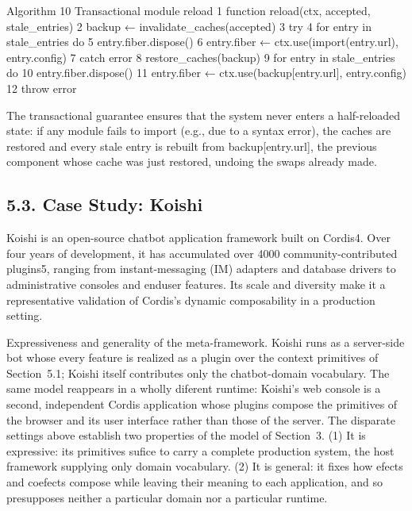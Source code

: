 \documentclass[
  10
]{article}
\begin{document}
Algorithm 10 Transactional module reload 1 function reload(ctx,
accepted, stale\_entries) 2 backup ← invalidate\_caches(accepted) 3 try
4 for entry in stale\_entries do 5 entry.fiber.dispose() 6 entry.fiber ←
ctx.use(import(entry.url), entry.config) 7 catch error 8
restore\_caches(backup) 9 for entry in stale\_entries do 10
entry.fiber.dispose() 11 entry.fiber ← ctx.use(backup{[}entry.url{]},
entry.config) 12 throw error

The transactional guarantee ensures that the system never enters a
half-reloaded state: if any module fails to import (e.g., due to a
syntax error), the caches are restored and every stale entry is rebuilt
from backup{[}entry.url{]}, the previous component whose cache was just
restored, undoing the swaps already made.

\subsection{5.3. Case Study: Koishi}\label{case-study-koishi}

Koishi is an open-source chatbot application framework built on Cordis4.
Over four years of development, it has accumulated over 4000
community-contributed plugins5, ranging from instant-messaging (IM)
adapters and database drivers to administrative consoles and enduser
features. Its scale and diversity make it a representative validation of
Cordis's dynamic composability in a production setting.

Expressiveness and generality of the meta-framework. Koishi runs as a
server-side bot whose every feature is realized as a plugin over the
context primitives of Section~5.1; Koishi itself contributes only the
chatbot-domain vocabulary. The same model reappears in a wholly diferent
runtime: Koishi's web console is a second, independent Cordis
application whose plugins compose the primitives of the browser and its
user interface rather than those of the server. The disparate settings
above establish two properties of the model of Section~3. (1) It is
expressive: its primitives sufice to carry a complete production system,
the host framework supplying only domain vocabulary. (2) It is general:
it fixes how efects and coefects compose while leaving their meaning to
each application, and so presupposes neither a particular domain nor a
particular runtime.
\end{document}
